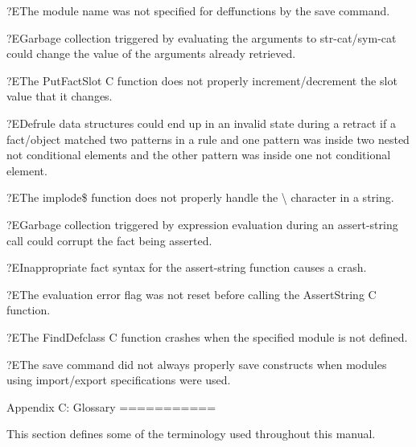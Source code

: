 \documentclass[letterpaper,10pt,english]{sphinxmanual}
\begin{document}
?EThe module name was not specified for deffunctions by the save
command.

?EGarbage collection triggered by evaluating the arguments to
str-cat/sym-cat could change the value of the arguments already
retrieved.

?EThe PutFactSlot C function does not properly increment/decrement the
slot value that it changes.

?EDefrule data structures could end up in an invalid state during a
retract if a fact/object matched two patterns in a rule and one pattern
was inside two nested not conditional elements and the other pattern was
inside one not conditional element.

?EThe implode\$ function does not properly handle the \textbackslash{} character in a
string.

?EGarbage collection triggered by expression evaluation during an
assert-string call could corrupt the fact being asserted.

?EInappropriate fact syntax for the assert-string function causes a
crash.

?EThe evaluation error flag was not reset before calling the
AssertString C function.

?EThe FindDefclass C function crashes when the specified module is not
defined.

?EThe save command did not always properly save constructs when modules
using import/export specifications were used.

Appendix C:
Glossary
===========

This section defines some of the terminology used throughout this
manual.
\end{document}
